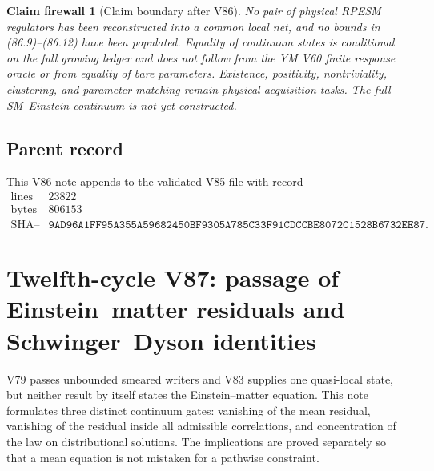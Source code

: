 \documentclass[11pt]{article}
\newtheorem{firewall}[theorem]{Claim firewall}
\theoremstyle{remark}
\begin{document}
\begin{firewall}[Claim boundary after V86]
\label{fire:v12v86-claim}
No pair of physical RPESM regulators has been reconstructed into a
common local net, and no bounds in (86.9)--(86.12) have been
populated.  Equality of continuum states is conditional on the full
growing ledger and does not follow from the YM V60 finite response
oracle or from equality of bare parameters.  Existence, positivity,
nontriviality, clustering, and parameter matching remain physical
acquisition tasks.  The full SM--Einstein continuum is not yet
constructed.
\end{firewall}

\subsection{Parent record}

This V86 note appends to the validated V85 file with record
\[
\begin{array}{c|c}
\text{lines}&23822\\
\text{bytes}&806153\\
\text{SHA--256}&
\texttt{9AD96A1FF95A355A59682450BF9305A785C33F91CDCCBE8072C1528B6732EE87}.
\end{array}
\]



\section{Twelfth-cycle V87: passage of Einstein--matter residuals and
Schwinger--Dyson identities}
\label{sec:v12v87}

V79 passes unbounded smeared writers and V83 supplies one quasi-local
state, but neither result by itself states the Einstein--matter
equation.  This note formulates three distinct continuum gates:
vanishing of the mean residual, vanishing of the residual inside all
admissible correlations, and concentration of the law on
distributional solutions.  The implications are proved separately
so that a mean equation is not mistaken for a pathwise constraint.
\end{document}
